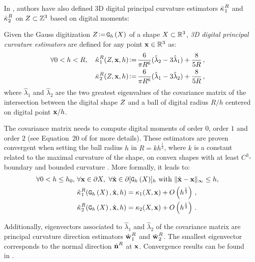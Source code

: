 \documentclass{llncs}
\begin{document}
In \cite{CVIU2014}, authors have also defined 3D digital principal curvature
estimators $\hat{\kappa_{}}_{1}^{R}$ and $\hat{\kappa_{}}_{2}^{R}$ on $Z\subset{\mathbb{Z}}^3$ based
on digital moments:
%
\begin{Definition}
  Given the Gauss digitization $Z \!\mathrel{\mathop:}=\! \mathtt{G}_{h}\left(X\right)$ of a shape $X \subset {\mathbb{R}}^3$,
  {\em 3D digital principal curvature estimators} are defined for any point $\mathbf{x}
  \in {\mathbb{R}}^3$ as:
  \begin{align}
    \forall 0 < h < R,\quad
    \hat{\kappa_{}}_{1}^{R}(Z,\mathbf{x},h) &\!\mathrel{\mathop:}=\! \frac{6}{\pi {R}^6}(\hat{\lambda}_2 - 3\hat{\lambda}_1) + \frac{8}{5 R} \,,\label{eq:dig-curvature-estimator-k1}\\
    \hat{\kappa_{}}_{2}^{R}(Z,\mathbf{x},h) &\!\mathrel{\mathop:}=\! \frac{6}{\pi {R}^6}(\hat{\lambda}_1 - 3\hat{\lambda}_2) + \frac{8}{5 R} \,,
    \label{eq:dig-curvature-estimator-k2}
  \end{align}
  where $\hat{\lambda}_1$ and $\hat{\lambda}_2$ are the two greatest eigenvalues
  of the covariance matrix of the intersection between the digital shape
  $Z$ and a ball of digital radius $R/h$ centered on digital point
  $\mathbf{x}/h$.
\end{Definition}
%
The covariance matrix needs to compute digital moments of order $0$, order $1$
and order $2$ (see Equation~20 of \cite{CVIU2014} for more details).
These estimators are proven convergent when setting the ball
radius $h$ in $R = kh^\frac{1}{3}$, where $k$ is a constant related to the
maximal curvature of the shape, on convex shapes with at least $C^3$-boundary
and bounded curvature \cite{CVIU2014}. More formally, it leads to:
%
\begin{align}
  \forall 0 < h \le h_0,\,\, &\forall \mathbf{x} \in \partial X,\,\,
  \forall \hat{\mathbf{x}} \in \partial \lbrack \mathtt{G}_{h}\left(X\right) \rbrack_{h} \text{~with~} \| \hat{\mathbf{x}} -\mathbf{x}\|_\infty \le h, \nonumber \\
  &\hat{\kappa_{}}_{1}^{R}(\mathtt{G}_{h}\left(X\right),\hat{\mathbf{x}}, h) = \kappa_{1}(X,\mathbf{x}) + O\left(h^{\frac{1}{3}}\right) \,,\\
  &\hat{\kappa_{}}_{2}^{R}(\mathtt{G}_{h}\left(X\right),\hat{\mathbf{x}}, h) = \kappa_{2}(X,\mathbf{x}) + O\left(h^{\frac{1}{3}}\right) \,.
\end{align}

Additionally, eigenvectors associated to $\hat{\lambda}_1$ and
$\hat{\lambda}_2$ of the covariance matrix are principal
curvature direction estimators $\hat{\mathbf{w}_{}}_{1}^{R}$ and
$\hat{\mathbf{w}_{}}_{2}^{R}$. The smallest eigenvector corresponds to the normal
direction $\hat{\mathbf{n}{}}^{R}$ at $\mathbf{x}$. Convergence results can be found
in \cite{ChapterIICurvature}.
\end{document}
